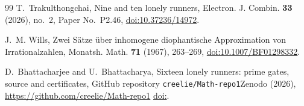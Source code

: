 \documentclass[11pt]{amsart}
\theoremstyle{definition}
\theoremstyle{remark}
\def\zenodoID{}%
\newcommand{\archivelink}{\ifx\zenodoID\empty\url{https://github.com/creelie/Math-repo1}%
 \else\href{https://doi.org/\zenodoID}{doi:\zenodoID}\fi}
\begin{document}
\begin{thebibliography}{99}
T.~Trakulthongchai, Nine and ten lonely runners, Electron. J. Combin.
\textbf{33} (2026), no.~2, Paper No.~P2.46,
\href{https://doi.org/10.37236/14972}{doi:10.37236/14972}.

J.~M. Wills, Zwei S\"atze \"uber inhomogene diophantische Approximation von
Irrationalzahlen, Monatsh. Math. \textbf{71} (1967), 263--269,
\href{https://doi.org/10.1007/BF01298332}{doi:10.1007/BF01298332}.

D.~Bhattacharjee and U.~Bhattacharya, Sixteen lonely runners: prime gates,
source and certificates, \ifx\zenodoID\empty GitHub repository
\texttt{creelie/Math-repo1}\else Zenodo\fi{} (2026), \archivelink.

\end{thebibliography}
\end{document}
